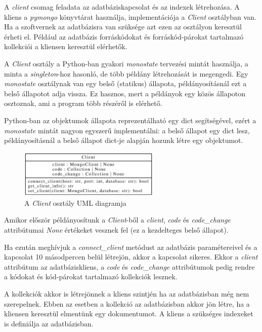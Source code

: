 A \emph{client} csomag feladata az adatbáziskapcsolat és az indexek létrehozása.
A kliens a \emph{pymongo} könyvtárat használja, implementációja a \emph{Client} osztályban van.
Ha a szoftvernek az adatbázisra van szüksége azt ezen az osztályon keresztül érheti el.
Például az adatbázis forráskódokat és forráskód-párokat tartalmazó kollekciói a kliensen
keresztül elérhetők.

A \emph{Client} osztály a Python-ban gyakori \emph{monostate} \cite{monostatePattern}
tervezési mintát használja, a minta a \emph{singleton}-hoz hasonló,
de több példány létrehozását is megengedi.
Egy \emph{monostate} osztálynak van egy belső (statikus) állapota,
példányosításnál ezt a belső állapotot adja vissza.
Ez hasznos, mert a példányok egy közös állapoton osztoznak, ami a program több részéről is elérhető.

Python-ban az objektumok állapota reprezentálható egy dict segítségével,
ezért a \emph{monostate} mintát nagyon egyszerű implementálni:
a belső állapot egy dict lesz, példányosításnál a belső állapot dict-je alapján hozunk létre egy objektumot.

\begin{figure}[H]
	\centering
	\includegraphics[width=0.6\textwidth]{images/uml/Client.eps}
	\caption{A \emph{Client} osztály UML diagramja}
\end{figure}

Amikor először példányosítunk a \emph{Client}-ből a \emph{client}, \emph{code} és \emph{code\_change}
attribútumai \emph{None} értékeket vesznek fel (ez a kezdelteges belső állapot).

Ha ezután meghívjuk a \emph{connect\_client} metódust az adatbázis paramétereivel
és a kapcsolat 10 másodpercen belül létrejön, akkor a kapcsolat sikeres.
Ekkor
a \emph{client} attribútum az adatbáziskliens,
a \emph{code} és \emph{code\_change} attribútumok pedig rendre
a kódokat és kód-párokat tartalmazó kollekciók lesznek.

A kollekciók akkor is létrejönnek a kliens szintjén ha az adatbázisban még nem szerepelnek.
Ebben az esetben a kollekció az adatbázisban akkor jön létre, ha a kliensen keresztül elmentünk egy dokumentumot.
A kliens a szükséges indexeket is definiálja az adatbázisban.

